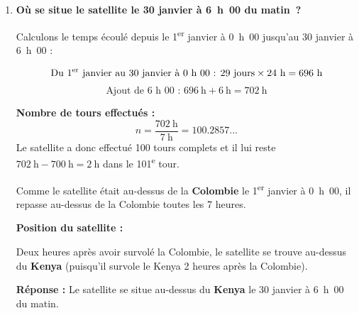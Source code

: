 \documentclass{article}
\begin{document}
\begin{enumerate}
\begin{enumerate}
        Le satellite passe au-dessus de l'Indonésie à 10~h~00 le 8 janvier. Comme sa période est de 7 heures, les passages suivants à 10~h~00 auront lieu tous les multiples de $k$ tels que :
        \[
        10~\text{h} + 7k~\text{h} \equiv 10~\text{h} \ (\text{mod}\ 24~\text{h})
        \]
        Ce qui revient à :
        \[
        7k~\text{h} \equiv 0 \ (\text{mod}\ 24~\text{h})
        \]
        Nous cherchons donc les entiers $k$ tels que $7k$ est un multiple de 24.

        Or, comme 7 et 24 sont premiers entre eux, le plus petit multiple commun est $7 \times 24 = 168$~h, soit 7 jours.

        Ainsi, le satellite passera au-dessus de l'Indonésie à 10~h~00 tous les 168~h, c'est-à-dire tous les 7 jours.

        \textbf{Dates des passages à 10~h~00 en janvier :}
        \begin{itemize}
            \item 8 janvier à 10~h~00
            \item 15 janvier à 10~h~00
            \item 22 janvier à 10~h~00
            \item 29 janvier à 10~h~00
        \end{itemize}

        Le satellite survolera donc l'Indonésie à 10~h~00 \textbf{4 fois} durant le mois de janvier.

    \end{enumerate}

    \item \textbf{Où se situe le satellite le 30 janvier à 6~h~00 du matin~?}

    Calculons le temps écoulé depuis le 1\textsuperscript{er} janvier à 0~h~00 jusqu'au 30 janvier à 6~h~00 :

    \[
    \text{Du 1\textsuperscript{er} janvier au 30 janvier à 0~h~00 : } 29~\text{jours} \times 24~\text{h} = 696~\text{h}
    \]
    \[
    \text{Ajout de 6~h~00 : } 696~\text{h} + 6~\text{h} = 702~\text{h}
    \]

    \textbf{Nombre de tours effectués :}
    \[
    n = \dfrac{702~\text{h}}{7~\text{h}} = 100.2857...
    \]
    Le satellite a donc effectué 100 tours complets et il lui reste $702~\text{h} - 700~\text{h} = 2~\text{h}$ dans le 101\textsuperscript{e} tour.

    Comme le satellite était au-dessus de la \textbf{Colombie} le 1\textsuperscript{er} janvier à 0~h~00, il repasse au-dessus de la Colombie toutes les 7 heures.

    \textbf{Position du satellite :}

    Deux heures après avoir survolé la Colombie, le satellite se trouve au-dessus du \textbf{Kenya} (puisqu'il survole le Kenya 2 heures après la Colombie).

    \textbf{Réponse :} Le satellite se situe au-dessus du \textbf{Kenya} le 30 janvier à 6~h~00 du matin.

\end{enumerate}
    
\end{document}
